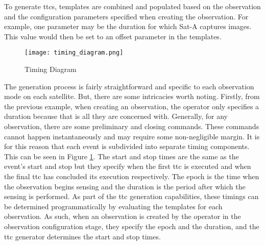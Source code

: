 To generate \glspl{ttc}, templates are combined and populated based on the
observation and the configuration parameters specified when creating the
observation. For example, one parameter may be the duration for which Sat-A
captures images. This value would then be set to an offset parameter in the
templates. 

\begin{figure}[h] 
    \centering
    \texttt{[image: timing\_diagram.png]} 
    \caption{Timing Diagram}
    \label{fig:timing} 
\end{figure}

The generation process is fairly straightforward and specific to each
observation mode on each satellite. But, there are some intricacies worth
noting. Firstly, from the previous example, when creating an observation, the
operator only specifies a duration because that is all they are concerned with.
Generally, for any observation, there are some preliminary and closing
commands. These commands cannot happen instantaneously and may require some
non-negligible margin. It is for this reason that each event is subdivided into
separate timing components. This can be seen in Figure \ref{fig:timing}. The
start and stop times are the same as the event’s start and stop but they
specify when the first \gls{ttc} is executed and when the final \gls{ttc} has
concluded its execution respectively. The epoch is the time when the
observation begins sensing and the duration is the period after which the
sensing is performed. As part of the \gls{ttc} generation capabilities, these
timings can be determined programmatically by evaluating the templates for each
observation. As such, when an observation is created by the operator in the
observation configuration stage, they specify the epoch and the duration, and
the \gls{ttc} generator determines the start and stop times.





